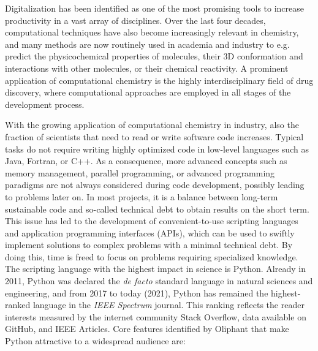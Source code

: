Digitalization has been identified as one of the most promising tools to increase productivity in a vast array of disciplines.\cite{Tuomi2018}
Over the last four decades, computational techniques have also become increasingly relevant in chemistry, and  many methods are now routinely used in academia and industry to e.g. predict the physicochemical properties of molecules, their 3D conformation and interactions with other molecules, or their chemical reactivity. A prominent application of computational chemistry is the highly interdisciplinary field of drug discovery, where computational approaches are employed in all stages of the development process.\cite{Chodera2011, Hansen2014, Abel2017, Cournia2017, Cournia2020, Meier2021}

With the growing application of computational chemistry in industry, also the fraction of scientists that need to read or write software code increases. Typical tasks do not require writing highly optimized code in low-level languages such as Java\cite{Gosling2000}, Fortran\cite{Backus1957}, or C++\cite{Stroustrup1995}. As a consequence, more advanced concepts such as memory management, parallel programming, or advanced programming paradigms are not always considered during code development, possibly leading to problems later on. In most projects, it is a balance between long-term sustainable code and so-called technical debt\cite{Alfayez2018} to obtain results on the short term. This issue has led to the development of convenient-to-use scripting languages and application programming interfaces (APIs), which can be used to swiftly implement solutions to complex problems with a minimal technical debt. By doing this, time is freed to focus on problems requiring specialized knowledge.\cite{Ayer2014} The scripting language with the highest impact in science is Python. Already in 2011, Python was declared the \textit{de facto} standard language in natural sciences and engineering, and from 2017 to today (2021), Python has remained the highest-ranked language in the \textit{IEEE Spectrum} journal. This ranking reflects the reader interests measured by the internet community Stack Overflow, data available on GitHub, and IEEE Articles. \cite{Millman2011, Vanderwalt2011, Cass2017, Cass2018, Cass2019, Cass2020, Cass2021} 
%
Core features identified by Oliphant\cite{Oliphant2007} that make Python attractive to a widespread audience are: 
